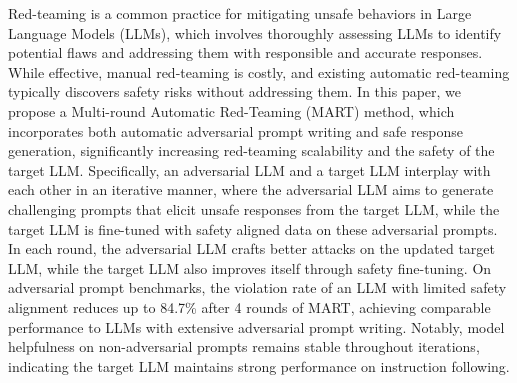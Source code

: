 Red-teaming is a common practice for mitigating unsafe behaviors in Large Language Models (LLMs), which involves thoroughly assessing LLMs to identify potential flaws and addressing them with responsible and accurate responses. While effective, manual red-teaming is costly, and existing automatic red-teaming typically discovers safety risks without addressing them. In this paper, we propose a Multi-round Automatic Red-Teaming (MART) method, which incorporates both automatic adversarial prompt writing and safe response generation, significantly increasing red-teaming scalability and the safety of the target LLM. Specifically, an adversarial LLM and a target LLM interplay with each other in an iterative manner, where the adversarial LLM aims to generate challenging prompts that elicit unsafe responses from the target LLM, while the target LLM is fine-tuned with safety aligned data on these adversarial prompts.  In each round, the adversarial LLM crafts better attacks on the updated target LLM, while the target LLM also improves itself through safety fine-tuning. On adversarial prompt benchmarks, the violation rate of an LLM with limited safety alignment reduces up to 84.7\% after 4 rounds of MART, achieving comparable performance to LLMs with extensive adversarial prompt writing.  Notably, model helpfulness on non-adversarial prompts remains stable throughout iterations, indicating the target LLM maintains strong performance on instruction following.